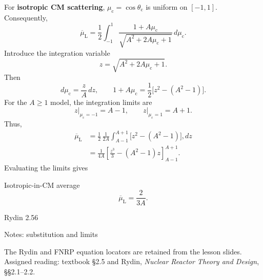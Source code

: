 \documentclass[board]{ne630handout}
\providecommand{\muc}{\mu_{\mathrm c}}
\providecommand{\thetac}{\theta_{\mathrm c}}
\providecommand{\SourceEq}[1]{\par\nobreak\hfill{\sffamily\scriptsize\color{KSUGray}#1}\par}
\begin{document}
\begin{handoutcolumns}
\switchcolumn
\RaggedRight
{}
For \textbf{isotropic CM scattering}, $\muc=\cos\thetac$ is uniform on $[-1,1]$.
Consequently,
\[
\overline\mu_{\mathrm L}
 =\frac12\int_{-1}^{1}\frac{1+A\muc}{\sqrt{A^2+2A\muc+1}}\,d\muc.
\]
Introduce the integration variable
\[
z=\sqrt{A^2+2A\muc+1}.
\]
Then
\[
d\muc=\frac{z}{A}\,dz,\qquad
 1+A\muc=\frac12\big[z^2-(A^2-1)\big].
\]
For the $A\geq1$ model, the integration limits are
\[
z\big|_{\muc=-1}=A-1,\qquad
  z\big|_{\muc=1}=A+1.
\]
Thus,
\begin{align*}
 \overline\mu_{\mathrm L}
  &=\frac12\,\frac{1}{2A}
    \int_{A-1}^{A+1}\big[z^2-(A^2-1)\big],dz\\[3pt]
  &=\frac{1}{4A}\left[\frac{z^3}{3}-(A^2-1)z\right]_{A-1}^{A+1}.
\end{align*}
Evaluating the limits gives
\begin{fixedbox}{Isotropic-in-CM average}
\[
\overline\mu_{\mathrm L}=\frac{2}{3A}.
\]
\SourceEq{Rydin 2.56}
\end{fixedbox}

\begin{boardbox}{Notes: substitution and limits}
\end{boardbox}

\begin{takeawaybox}
The Rydin and FNRP equation locators are retained from the lesson slides.
Assigned reading: textbook \S2.5 and Rydin,
\textit{Nuclear Reactor Theory and Design}, \S\S2.1--2.2.
\end{takeawaybox}
\end{handoutcolumns}
\end{document}
